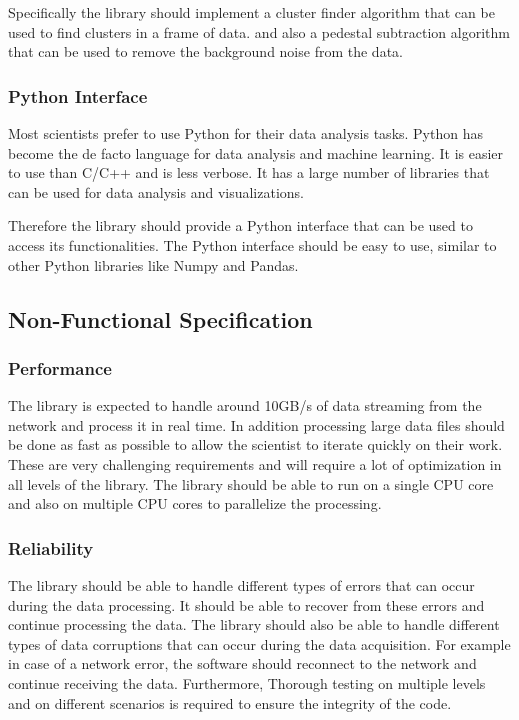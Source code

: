 \begin{spacing}{1.2}
    Specifically the library should implement a cluster finder algorithm that can be used to find clusters in a frame of data.
    and also a pedestal subtraction algorithm that can be used to remove the background noise from the data.

    \subsubsection{Python Interface}

    Most scientists prefer to use Python for their data analysis tasks. Python has
    become the de facto language for data analysis and machine learning.
    It is easier to use than C/C++ and is less verbose. It has a large number of libraries
    that can be used for data analysis and visualizations.

    Therefore the library should provide a Python interface that can be used to access its functionalities.
    The Python interface should be easy to use, similar to other Python libraries like Numpy and Pandas.



    \subsection{Non-Functional Specification}
    \subsubsection{Performance}
    The library is expected to handle around 10GB/s of data streaming from the network and process it in real time.
    In addition processing large data files should be done as fast as possible to allow the scientist to iterate quickly on their work.
    These are very challenging requirements and will require a lot of optimization in all levels of the library.
    The library should be able to run on a single CPU core and also on multiple CPU cores to parallelize the processing.

    \subsubsection{Reliability}
    The library should be able to handle different types of errors that can occur during the data processing.
    It should be able to recover from these errors and continue processing the data.
    The library should also be able to handle different types of data corruptions that can occur during the data acquisition.
    For example in case of a network error, the software should reconnect to the network and continue receiving the data.
    Furthermore, Thorough testing on multiple levels and on different scenarios is required to ensure the integrity of the code.


\end{spacing}
